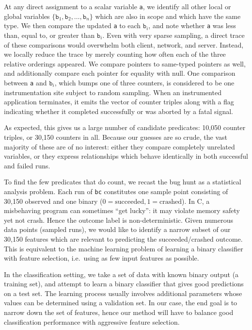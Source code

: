 At any direct assignment to a scalar variable \texttt{a}, we identify
all other local or global variables $\{ \mathtt{b}_1, \mathtt{b}_2,
\dots, \mathtt{b}_n \}$ which are also in scope and which have the
same type.  We then compare the updated \texttt{a} to each
$\mathtt{b}_i$, and note whether \texttt{a} was less than, equal to,
or greater than $\mathtt{b}_i$.  Even with very sparse sampling, a
direct trace of these comparisons would overwhelm both client,
network, and server.  Instead, we locally reduce the trace by merely
counting how often each of the three relative orderings appeared.  We
compare pointers to same-typed pointers as well, and additionally
compare each pointer for equality with null.  One comparison between
\texttt{a} and $\mathtt{b}_i$, which bumps one of three counters, is
considered to be one instrumentation site subject to random sampling.
When an instrumented application terminates, it emits the vector of
counter triples along with a flag indicating whether it completed
successfully or was aborted by a fatal signal.

As expected, this gives us a large number of candidate predicates:
10,050 counter triples, or 30,150 counters in all.  Because our
guesses are so crude, the vast majority of these are of no interest:
either they compare completely unrelated variables, or they express
relationships which behave identically in both successful and failed
runs.

To find the few predicates that do count, we recast the bug hunt as a
statistical analysis problem.  Each run of \texttt{bc} constitutes one
sample point consisting of 30,150 observed  and one
binary  ($0 = \text{succeeded}, 1 = \text{crashed}$).
In C, a misbehaving program can sometimes ``get lucky'': it may
violate memory safety yet not crash.  Hence the outcome label is
non-deterministic.  Given numerous data points (sampled runs), we
would like to identify a narrow subset of our 30,150 features which
are relevant to predicting the succeeded/crashed outcome.  This is
equivalent to the machine learning problem of learning a binary
classifier with feature selection, i.e.\ using as few input features
as possible.

In the classification setting, we take a set of data
with known binary output (a training set), and attempt to learn a
binary classifier that gives good predictions on a test set.  The
learning process usually involves additional parameters whose values can
be determined using a validation set.  In our case, the end goal is to
narrow down the set of features, hence our method will have to balance
good classification performance with aggressive feature selection.

